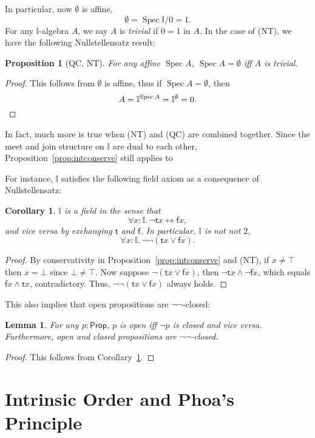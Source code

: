 \documentclass[12pt]{amsart}
\newtheorem{lemma}[theorem]{Lemma}
\newtheorem{corollary}[theorem]{Corollary}
\newtheorem{proposition}[theorem]{Proposition}
\theoremstyle{definition}
\newcommand{\mbb}[1]{\mathbb{#1}}
\newcommand{\I}{\mbb I}
\newcommand{\ms}[1]{\mathsf{#1}}
\newcommand{\dneg}{\neg\neg}
\newcommand{\fa}[2]{\forall #1\!\colon\!\!#2.\ }
\newcommand{\emp}{\emptyset}
\newcommand{\eq}{\leftrightarrow}
\newcommand{\pp}{\ms{Prop}}
\newcommand{\spec}{\operatorname{Spec}}
\begin{document}
In particular, now $\emp$ is affine,
\[ \emp = \spec \I/0=1. \]
For any $\I$-algebra $A$, we say $A$ is \emph{trivial} if $0 = 1$ in $A$. In the case of (NT), we have the following Nullstellensatz result:

\begin{proposition}[QC, NT]\label{prop:nulls}
  For any affine $\spec A$, $\spec A = \emp$ iff $A$ is trivial.
\end{proposition}
\begin{proof}
  This follows from $\emp$ is affine, thus if $\spec A = \emp$, then
  \[ A = \I^{\spec A} = \I^\emp = 0. \qedhere \]
\end{proof}

In fact, much more is true when (NT) and (QC) are combined together. Since the meet and join structure on $\I$ are dual to each other, Proposition~\ref{prop:intconserve} still applies to 

For instance, $\I$ satisfies the following field axiom as a consequence of Nullstellensatz:

\begin{corollary}\label{cor:field}
  $\I$ is a field in the sense that
  \[ \fa x{\I} \neg \ms tx \eq \ms fx, \]
  and vice versa by exchanging $\ms t$ and $\ms f$. In particular, $\I$ is not not $2$,
  \[ \fa x\I \dneg(\ms tx \vee \ms fx). \]
\end{corollary}
\begin{proof}
  By conservativity in Proposition~\ref{prop:intconserve} and (NT), if $x \neq \top$ then $x = \bot$ since $\bot \neq \top$. Now suppose $\neg(\ms tx \vee \ms fx)$, then $\neg\ms tx \wedge \neg \ms fx$, which equals $\ms fx \wedge \ms tx$, contradictory. Thus, $\dneg(\ms tx\vee\ms fx)$ always holds.
\end{proof}

This also implies that open propositions are $\dneg$-closed:

\begin{lemma}\label{lem:opendnegclose}
  For any $p : \pp$, $p$ is open iff $\neg p$ is closed and vice versa. Furthermore, open and closed propositions are $\dneg$-closed.
\end{lemma}
\begin{proof}
  This follows from Corollary~\ref{cor:field}.
\end{proof}

\section{Intrinsic Order and Phoa's Principle}
\end{document}
